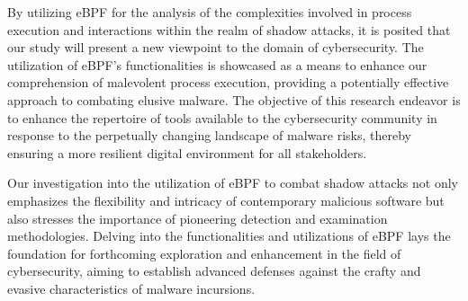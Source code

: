 By utilizing eBPF for the analysis of the complexities involved in process execution and interactions within the realm of shadow attacks, it is posited that our study will present a new viewpoint to the domain of cybersecurity. The utilization of eBPF's functionalities is showcased as a means to enhance our comprehension of malevolent process execution, providing a potentially effective approach to combating elusive malware. The objective of this research endeavor is to enhance the repertoire of tools available to the cybersecurity community in response to the perpetually changing landscape of malware risks, thereby ensuring a more resilient digital environment for all stakeholders.

Our investigation into the utilization of eBPF to combat shadow attacks not only emphasizes the flexibility and intricacy of contemporary malicious software but also stresses the importance of pioneering detection and examination methodologies. Delving into the functionalities and utilizations of eBPF lays the foundation for forthcoming exploration and enhancement in the field of cybersecurity, aiming to establish advanced defenses against the crafty and evasive characteristics of malware incursions.
